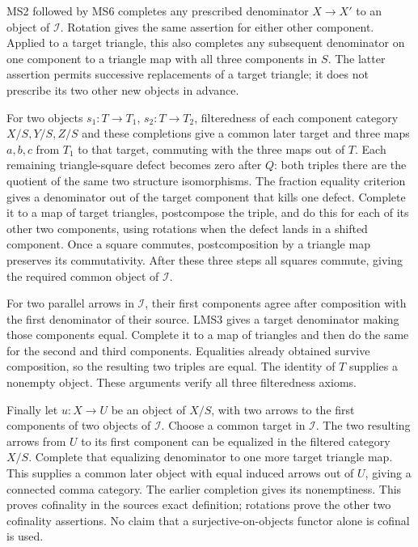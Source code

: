MS2 followed by MS6 completes any prescribed denominator \(X\to X'\) to an object of \(\mathcal I\). Rotation gives the same assertion for either other component. Applied to a target triangle,\allowbreak{} this also completes any subsequent denominator on one component to a triangle map with all three components in \(S\). The latter assertion permits successive replacements of a target triangle; it does not prescribe its two other new objects in advance.

For two objects \(s_1:T\to T_1\),\allowbreak{} \(s_2:T\to T_2\),\allowbreak{} filteredness of each component category \(X/S,Y/S,Z/S\) and these completions give a common later target and three maps \(a,b,c\) from \(T_1\) to that target,\allowbreak{} commuting with the three maps out of \(T\). Each remaining triangle-square defect becomes zero after \(Q\):\allowbreak{} both triples there are the quotient of the same two structure isomorphisms. The fraction equality criterion gives a denominator out of the target component that kills one defect. Complete it to a map of target triangles,\allowbreak{} postcompose the triple,\allowbreak{} and do this for each of its other two components,\allowbreak{} using rotations when the defect lands in a shifted component. Once a square commutes,\allowbreak{} postcomposition by a triangle map preserves its commutativity. After these three steps all squares commute,\allowbreak{} giving the required common object of \(\mathcal I\).

For two parallel arrows in \(\mathcal I\),\allowbreak{} their first components agree after composition with the first denominator of their source. LMS3 gives a target denominator making those components equal. Complete it to a map of triangles and then do the same for the second and third components. Equalities already obtained survive composition,\allowbreak{} so the resulting two triples are equal. The identity of \(T\) supplies a nonempty object. These arguments verify all three filteredness axioms.

Finally let \(u:X\to U\) be an object of \(X/S\),\allowbreak{} with two arrows to the first components of two objects of \(\mathcal I\). Choose a common target in \(\mathcal I\). The two resulting arrows from \(U\) to its first component can be equalized in the filtered category \(X/S\). Complete that equalizing denominator to one more target triangle map. This supplies a common later object with equal induced arrows out of \(U\),\allowbreak{} giving a connected comma category. The earlier completion gives its nonemptiness. This proves cofinality in the source\textquotesingle s exact definition; rotations prove the other two cofinality assertions. No claim that a surjective-on-objects functor alone is cofinal is used.

